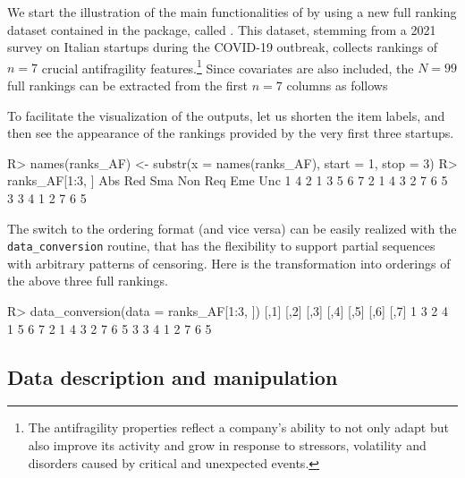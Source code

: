We start the illustration of the main functionalities of  by using a new full ranking dataset contained in the package, called . This dataset, stemming from a 2021 survey on Italian startups during the COVID-19 outbreak, collects rankings of $n=7$ crucial antifragility features.\footnote{The antifragility properties reflect a company's ability to not only adapt but also improve its activity and grow in response to stressors, volatility and disorders caused by critical and unexpected events.}
Since covariates are also included, the $N=99$ full rankings can be extracted from the first $n=7$ columns as follows
To facilitate the visualization of the outputs, let us shorten the item labels, and then see the appearance of the rankings provided by the very first three startups.
\begin{example}
R> names(ranks_AF) <- substr(x = names(ranks_AF), start = 1, stop = 3)
R> ranks_AF[1:3, ]
  Abs Red Sma Non Req Eme Unc
1   4   2   1   3   5   6   7
2   1   4   3   2   7   6   5
3   3   4   1   2   7   6   5
\end{example}

The switch to the ordering format (and vice versa) can be easily realized with the \texttt{data\_conversion} routine, that has the flexibility to support partial sequences with arbitrary patterns of censoring. Here is the transformation into orderings of the above three full rankings.
\begin{example}
R> data_conversion(data = ranks_AF[1:3, ])
  [,1] [,2] [,3] [,4] [,5] [,6] [,7]
1    3    2    4    1    5    6    7
2    1    4    3    2    7    6    5
3    3    4    1    2    7    6    5
\end{example}

\subsection{Data description and manipulation}
\label{subsec:descr}

